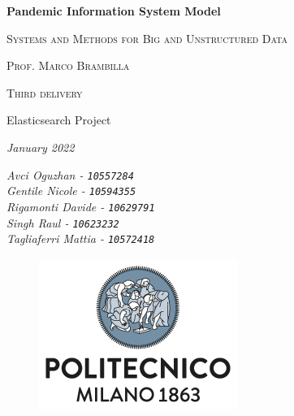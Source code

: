 \documentclass[12pt, a4paper]{article}
\begin{document}

\begin{titlepage}
    \centering
    {\Huge\bfseries Pandemic Information System Model\par} %
    \vspace{1.5cm}
    {\scshape\large Systems and Methods for Big and Unstructured Data \par} %
    \vspace{0.5cm}
    {\scshape\large Prof. Marco Brambilla \par} %
    \vspace{1cm}
    {\scshape\large %
        Third delivery \par 
        Elasticsearch Project \par 
    }
    \vspace{0.5cm}
    {\slshape\large January 2022 \par} %
    \vspace{1cm}
    \linespread{0.8} %
    {\large\itshape %
        Avci Oguzhan - \texttt{10557284}\\
        Gentile Nicole - \texttt{10594355}\\
        Rigamonti Davide - \texttt{10629791}\\
        Singh Raul - \texttt{10623232}\\
        Tagliaferri Mattia - \texttt{10572418}
    }
    \vfill
    \begin{figure}[b]
        \includegraphics[scale=0.6]{polimi.png} %
        \centering
    \end{figure}


\end{titlepage}

\end{document}
